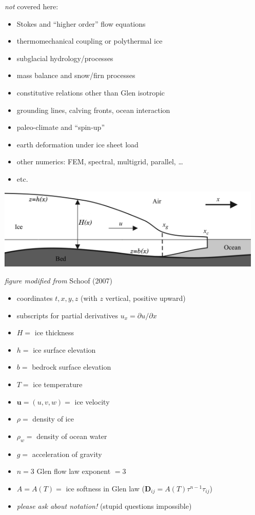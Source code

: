 \documentclass[titlepage,letterpaper,final,11pt]{scrartcl}
\newcommand{\alert}[1]{\emph{#1}}
\begin{document}
\emph{not} \normalsize covered here:

  \begin{itemize}
  \item Stokes and ``higher order'' flow equations
  \item thermomechanical coupling or polythermal ice
  \item subglacial hydrology/processes
  \item mass balance and snow/firn processes
  \item constitutive relations other than Glen isotropic
  \item grounding lines, calving fronts, ocean interaction
  \item paleo-climate and ``spin-up''
  \item earth deformation under ice sheet load
  \item other numerics: FEM, spectral, multigrid, parallel, \dots
  \item etc.
  \end{itemize}


\begin{center}
  \includegraphics[width=5.0in]{flowline}

\emph{figure modified from} Schoof (2007)\nocite{SchoofMarine1}
\end{center}

  \begin{itemize}
  \item coordinates $t,x,y,z$  (with $z$ vertical, positive upward)
  \item subscripts for partial derivatives $u_x = \partial u/\partial x$
  \item $H=$ ice thickness
  \item $h=$ ice surface elevation
  \item $b=$ bedrock surface elevation
  \item $T=$ ice temperature
  \item $\mathbf{u}=(u,v,w)=$ ice velocity
  \item $\rho=$ density of ice
  \item $\rho_w=$ density of ocean water
  \item $g=$ acceleration of gravity
  \item $n=3$ Glen flow law exponent $=3$
  \item $A=A(T)=$ ice softness in Glen law ($\mathbf{D}_{ij} = A(T) \tau^{n-1} \tau_{ij}$)
  \item \alert{please ask about notation!}  (stupid questions impossible)
  \end{itemize}
\end{document}
